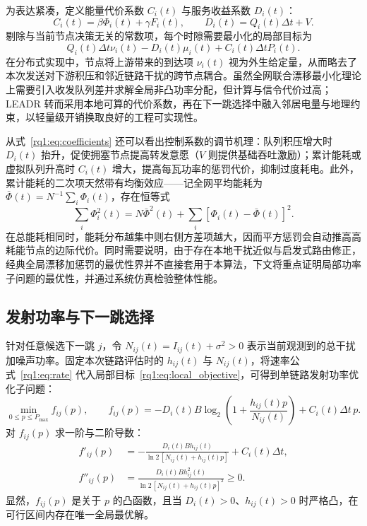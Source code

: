 为表达紧凑，定义能量代价系数 $C_i(t)$ 与服务收益系数 $D_i(t)$：
\begin{equation}
 C_i(t)=\beta\Phi_i(t)+\gamma F_i(t),\qquad
 D_i(t)=Q_i(t)\Delta t+V.
 \label{rq1:eq:coefficients}
\end{equation}
剔除与当前节点决策无关的常数项，每个时隙需要最小化的局部目标为
\begin{equation}
 Q_i(t)\Delta t\nu_i(t)-D_i(t)\mu_i(t)+C_i(t)\Delta tP_i(t).
 \label{rq1:eq:local_objective}
\end{equation}
在分布式实现中，节点将上游带来的到达项 $\nu_i(t)$ 视为外生给定量，从而略去了本次发送对下游积压和邻近链路干扰的跨节点耦合。虽然全网联合漂移最小化理论上需要引入收发队列差并求解全局非凸功率分配，但计算与信令代价过高；LEADR 转而采用本地可算的代价系数，再在下一跳选择中融入邻居电量与地理约束，以轻量级开销换取良好的工程可实现性。

从式~\eqref{rq1:eq:coefficients} 还可以看出控制系数的调节机理：队列积压增大时 $D_i(t)$ 抬升，促使拥塞节点提高转发意愿（$V$ 则提供基础吞吐激励）；累计能耗或虚拟队列升高时 $C_i(t)$ 增大，提高每瓦功率的惩罚代价，抑制过度耗电。此外，累计能耗的二次项天然带有均衡效应——记全网平均能耗为 $\bar\Phi(t)=N^{-1}\sum_i\Phi_i(t)$，存在恒等式
\begin{equation}
 \sum_i\Phi_i^2(t)=N\bar\Phi^2(t)
                  +\sum_i[\Phi_i(t)-\bar\Phi(t)]^2.
 \label{rq1:eq:energy_variance_identity}
\end{equation}
在总能耗相同时，能耗分布越集中则右侧方差项越大，因而平方惩罚会自动推高高耗能节点的边际代价。同时需要说明，由于存在本地干扰近似与启发式路由修正，经典全局漂移加惩罚的最优性界并不直接套用于本算法，下文将重点证明局部功率子问题的最优性，并通过系统仿真检验整体性能。

\subsection{发射功率与下一跳选择}

针对任意候选下一跳 $j$，令 $N_{ij}(t)=I_{ij}(t)+\sigma^2>0$ 表示当前观测到的总干扰加噪声功率。固定本次链路评估时的 $h_{ij}(t)$ 与 $N_{ij}(t)$，将速率公式~\eqref{rq1:eq:rate} 代入局部目标~\eqref{rq1:eq:local_objective}，可得到单链路发射功率优化子问题：
\begin{equation}
 \min_{0\le p\le P_{\max}} f_{ij}(p),\qquad
 f_{ij}(p)=-D_i(t)B\log_2\!\left(1+\frac{h_{ij}(t)p}{N_{ij}(t)}\right)
                         +C_i(t)\Delta t\,p.
 \label{rq1:eq:power_problem}
\end{equation}
对 $f_{ij}(p)$ 求一阶与二阶导数：
\begin{align}
 f'_{ij}(p)&=-\frac{D_i(t)Bh_{ij}(t)}{\ln2\,[N_{ij}(t)+h_{ij}(t)p]}
                       +C_i(t)\Delta t,
 \label{rq1:eq:first_derivative}\\
 f''_{ij}(p)&=\frac{D_i(t)B h_{ij}^2(t)}{\ln2\,[N_{ij}(t)+h_{ij}(t)p]^2}\ge0.
 \label{rq1:eq:second_derivative}
\end{align}
显然，$f_{ij}(p)$ 是关于 $p$ 的凸函数，且当 $D_i(t)>0$、$h_{ij}(t)>0$ 时严格凸，在可行区间内存在唯一全局最优解。

